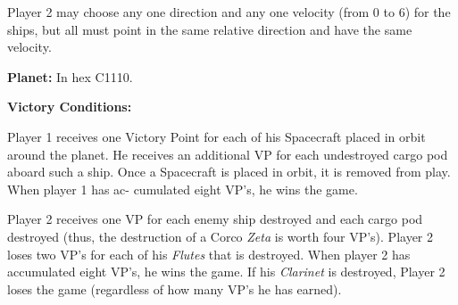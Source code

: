 Player 2 may choose any one direction and any one velocity (from 0 to
6) for the ships, but all must point in the same relative direction
and have the same velocity.

\textbf{Planet:} In hex C1110. 

\textbf{Victory Conditions:}

Player 1 receives one Victory Point for each of his Spacecraft placed
in orbit around the planet. He receives an additional VP for each
undestroyed cargo pod aboard such a ship. Once a Spacecraft is placed
in orbit, it is removed from play. When player 1 has ac- cumulated
eight VP's, he wins the game.

Player 2 receives one VP for each enemy ship destroyed and each cargo
pod destroyed (thus, the destruction of a Corco \emph{Zeta} is worth
four VP's). Player 2 loses two VP's for each of his \emph{Flutes} that
is destroyed. When player 2 has accumulated eight VP's, he wins the
game.  If his \emph{Clarinet} is destroyed, Player 2 loses the game
(regardless of how many VP's he has earned).

\bigskip




